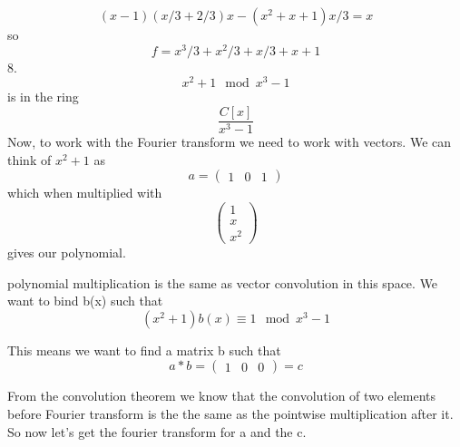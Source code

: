 \documentclass{article}
\begin{document}
\begin{equation}
	(x-1)(x/3+2/3)x-(x^2+x+1)x/3 = x
\end{equation}
so
\begin{equation}
	f = x^3/3+x^2/3+x/3+x+1
\end{equation}
8.
\begin{equation}
	x^2+1 \mod x^3-1
\end{equation}
is in the ring 
\begin{equation}
	\dfrac{C[x]}{x^3-1}
\end{equation}
Now, to work with the Fourier transform we need to work with vectors. We can think of $x^2+1$ as 
\begin{equation}
	a=\begin{pmatrix}
		1 & 0 & 1 
	\end{pmatrix}
\end{equation}
which when multiplied with 
\begin{equation}
	\begin{pmatrix}
		1  \\x \\ x^2 
	\end{pmatrix}
\end{equation}
gives our polynomial.

polynomial multiplication is the same as vector convolution in this space. We want to bind b(x) such that
\begin{equation}
	(x^2+1)b(x) \equiv 1 \mod x^3-1
\end{equation}

This means we want to find a matrix b such that
\begin{equation}
	a*b = \begin{pmatrix}
		1 & 0 & 0
	\end{pmatrix}=c
\end{equation}

From the convolution theorem we know that the convolution of two elements before Fourier transform is the the same as the pointwise multiplication after it. So now let's get the fourier transform for a and the c.
\end{document}
